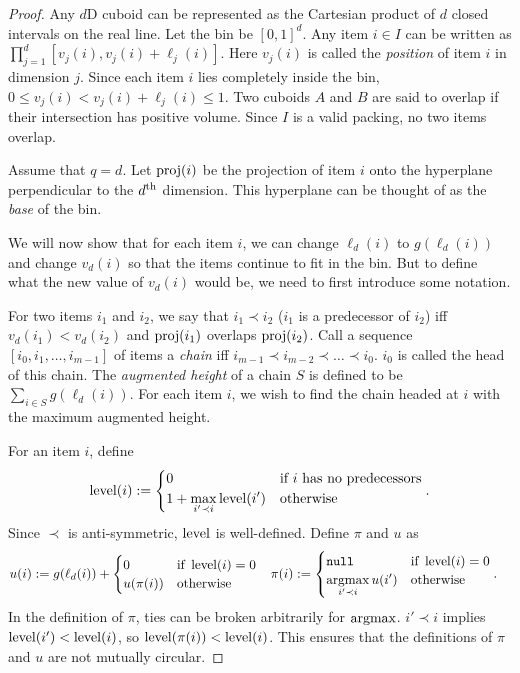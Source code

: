 \begin{proof}
Any $d$D cuboid can be represented as the Cartesian product of
$d$ closed intervals on the real line. Let the bin be $[0, 1]^d$.
Any item $i \in I$ can be written as $\prod_{j=1}^d [v_j(i), v_j(i) + \ell_j(i)]$.
Here $v_j(i)$ is called the \emph{position} of item $i$ in dimension $j$.
Since each item $i$ lies completely inside the bin, $0 \le v_j(i) < v_j(i) + \ell_j(i) \le 1$.
Two cuboids $A$ and $B$ are said to overlap if their intersection has positive volume.
Since $I$ is a valid packing, no two items overlap.

Assume \wLoG{} that $q = d$.
Let $\operatorname{proj}(i)$ be the projection of item $i$ onto the hyperplane
perpendicular to the $d^{\textrm{th}}$ dimension.
This hyperplane can be thought of as the \emph{base} of the bin.

We will now show that for each item $i$, we can change $\ell_d(i)$ to $g(\ell_d(i))$
and change $v_d(i)$ so that the items continue to fit in the bin.
But to define what the new value of $v_d(i)$ would be,
we need to first introduce some notation.

For two items $i_1$ and $i_2$, we say that $i_1 \prec i_2$
($i_1$ is a predecessor of $i_2$)
iff $v_d(i_1) < v_d(i_2)$ and $\operatorname{proj}(i_1)$ overlaps $\operatorname{proj}(i_2)$.
Call a sequence $[i_0, i_1, \ldots, i_{m-1}]$ of items a \emph{chain}
iff $i_{m-1} \prec i_{m-2} \prec \ldots \prec i_0$. $i_0$ is called the head of this chain.
The \emph{augmented height} of a chain $S$ is defined to be
$\sum_{i \in S} g(\ell_d(i))$.
For each item $i$, we wish to find the chain headed at $i$
with the maximum augmented height.

For an item $i$, define
\[ \operatorname{level}(i) := \begin{cases} 0 & \textrm{if } i \textrm{ has no predecessors}
\\ {\displaystyle 1 + \max_{i' \prec i} \operatorname{level}(i')} & \textrm{otherwise} \end{cases}. \]
Since $\prec$ is anti-symmetric, $\operatorname{level}$ is well-defined.
Define $\pi$ and $u$ as
\begin{align*}
u(i) &:= g(\ell_d(i)) + \begin{cases} 0 & \textrm{if } \operatorname{level}(i) = 0
    \\ u(\pi(i)) & \textrm{otherwise}\end{cases}
& \pi(i) &:= \begin{cases} \texttt{null} & \textrm{if } \operatorname{level}(i) = 0
\\ {\displaystyle \operatorname*{argmax}_{i' \prec i} u(i')} & \textrm{otherwise} \end{cases}.
\end{align*}
In the definition of $\pi$, ties can be broken arbitrarily for $\operatorname*{argmax}$.
$i' \prec i$ implies $\operatorname{level}(i') < \operatorname{level}(i)$, so $\operatorname{level}(\pi(i)) < \operatorname{level}(i)$.
This ensures that the definitions of $\pi$ and $u$ are not mutually circular.


\end{proof}

